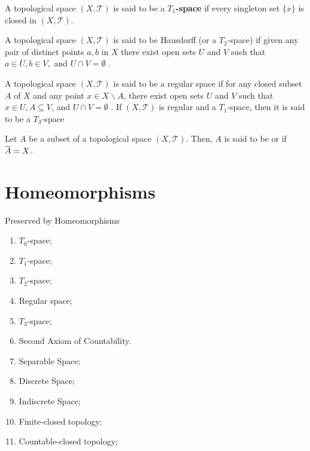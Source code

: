 \documentclass[10pt,a4paper]{report}
\newcommand{\TT}{\mathcal{T}}
\begin{document}
\begin{definition}[$T_1$ Spaces]A topological space $(X, \TT)$ is said to be a \textbf{$T_1$-space} if every singleton set $\{x\}$ is closed in $(X,\TT)$.
\end{definition}

\begin{definition}A topological space $(X,
\TT )$ is said to be Hausdorff (or a $T_2$-space) if given any
pair of distinct points $a, b$ in $X$ there exist open sets $U$ and $V$ such that $a \in U, b \in V,$ and $U \cap V = \emptyset$ .
\end{definition}

\begin{definition}A topological space $(X,
\TT )$ is said to be a regular space if for any closed subset
$A$ of $X$ and any point $x \in X \backslash A$, there exist open sets $U$ and $V$ such that $x \in U, A \subseteq V$, and $U \cap V = \emptyset$ . If $(X, \TT )$ is regular and a $T_1$-space, then it is
said to be a $T_3$-space
\end{definition}

\begin{definition}[Dense] Let $A$ be a subset of a topological space $(X, \TT)$.  Then, $A$ is said to be  or  if $\overline{A} =X$.
\end{definition}

\section{Homeomorphisms}

\begin{remark}Preserved by Homeomorphisms
\begin{enumerate}
	\item $T_0$-space;
	\item $T_1$-space;
	\item $T_2$-space;
	\item Regular space;
	\item $T_3$-space;
	\item Second Axiom of Countability.
	\item Separable Space;
	\item Discrete Space;
	\item Indiscrete Space;
	\item Finite-closed topology;
	\item Countable-closed topology;
\end{enumerate}
\end{remark}
\end{document}
